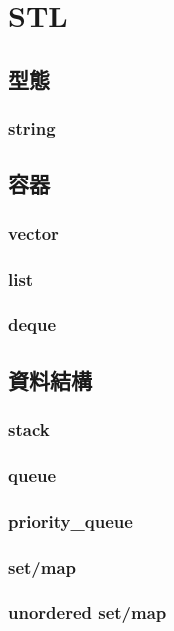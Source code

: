 \documentclass{article}
\begin{document}
\section{STL}

\subsection{型態}
\subsubsection{string}

\subsection{容器}
\subsubsection{vector}

\subsubsection{list}

\subsubsection{deque}

\subsection{資料結構}
\subsubsection{stack}

\subsubsection{queue}

\subsubsection{priority\_queue}

\subsubsection{set/map}

\subsubsection{unordered set/map}
\end{document}

